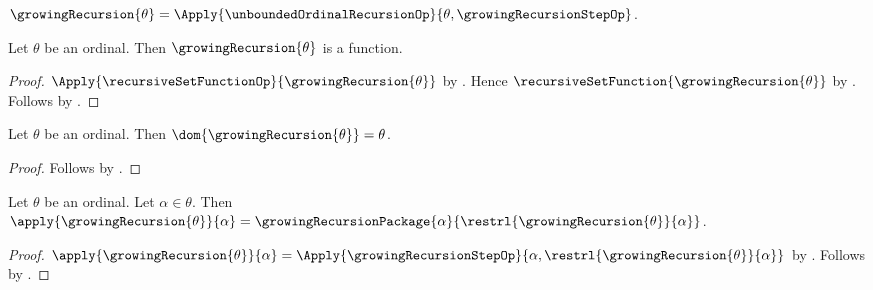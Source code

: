 \begin{definition}\label{growing_recursion}
    $\growingRecursion{\theta}=
        \Apply{\unboundedOrdinalRecursionOp}
            {\theta,\growingRecursionStepOp}$.
\end{definition}

\begin{proposition}\label{growing_recursion_function}
    Let $\theta$ be an ordinal.
    Then $\growingRecursion{\theta}$ is a function.
\end{proposition}
\begin{proof}
    $\Apply{\recursiveSetFunctionOp}{\growingRecursion{\theta}}$ by
        .
    Hence $\recursiveSetFunction{\growingRecursion{\theta}}$ by
        .
    Follows by .
\end{proof}

\begin{proposition}\label{growing_recursion_domain}
    Let $\theta$ be an ordinal.
    Then $\dom{\growingRecursion{\theta}}=\theta$.
\end{proposition}
\begin{proof}
    Follows by
        .
\end{proof}

\begin{proposition}\label{growing_recursion_equation}
    Let $\theta$ be an ordinal.
    Let $\alpha\in\theta$.
    Then $\apply{\growingRecursion{\theta}}{\alpha}
        =\growingRecursionPackage{\alpha}{
            \restrl{\growingRecursion{\theta}}{\alpha}}$.
\end{proposition}
\begin{proof}
    $\apply{\growingRecursion{\theta}}{\alpha}
        =\Apply{\growingRecursionStepOp}{\alpha,
            \restrl{\growingRecursion{\theta}}{\alpha}}$ by
        .
    Follows by .
\end{proof}

